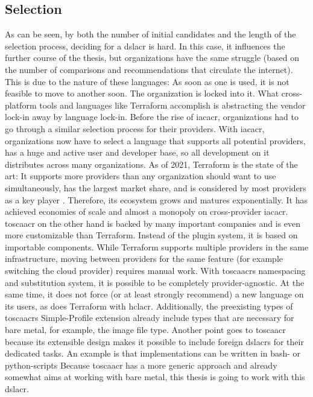 \subsection{Selection}
As can be seen, by both the number of initial candidates and the length of the selection process, deciding for a \gls{dslacr} is hard. In this case, it  influences the further course of the thesis, but organizations have the same struggle (based on the number of comparisons and recommendations that circulate the internet). %
This is due to the nature of these languages: As soon as one is used, it is not feasible to move to another soon. The organization is locked into it. What cross-platform tools and languages like Terraform accomplish is abstracting the vendor lock-in away by language lock-in. Before the rise of \gls{iacacr}, organizations had to go through a similar selection process for their providers. With \gls{iacacr}, organizations now have to select a language that supports all potential providers, has a huge and active user and developer base, so all development on it distributes across many organizations.
\newline
As of 2021, Terraform is the state of the art: It supports more providers than any organization should want to use simultaneously, has the largest market share, and is considered by most providers as a key player \cite{jetbrains_devops_ecosystem_2019}. Therefore, its ecosystem grows and matures exponentially. It has achieved economies of scale and almost a monopoly on cross-provider \gls{iacacr}.
\newline
\Gls{toscaacr} on the other hand is backed by many important companies and is even more customizable than Terraform. Instead of the plugin system, it is based on importable components. While Terraform supports multiple providers in the same infrastructure, moving between providers for the same feature (for example switching the cloud provider) requires manual work. With \gls{toscaacr}s namespacing and substitution system, it is possible to be completely provider-agnostic. At the same time, it does not force (or at least strongly recommend) a new language on its users, as does Terraform with \gls{hclacr}. Additionally, the preexisting types of \gls{toscaacr}s Simple-Profile extension already include types that are necessary for bare metal, for example, the image file type. Another point goes to \gls{toscaacr} because its extensible design makes it possible to include foreign \gls{dslacr}s for their dedicated tasks. An example is that implementations can be written in bash- or python-scripts 
\newline
Because \gls{toscaacr} has a more generic approach and already somewhat aims at working with bare metal, this thesis is going to work with this \gls{dslacr}.

